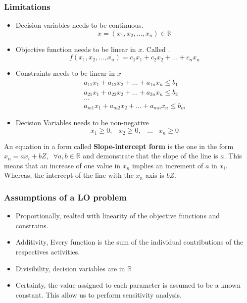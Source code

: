 \subsubsection{Limitations}
\begin{itemize}
    \item Decision variables needs to be continuous. 
        \[x = (x_1, x_2, \dots , x_n) \in \mathbb{R}\]
    \item Objective function needs to be linear in $x$. Called \textit{}.
        \[ f(x_1,x_2, \dots, x_n) = c_1x_1 + c_2x_2 + \dots + c_nx_n \]
    \item Constraints needs to be linear in $x$
        \begin{gather*}
            a_{11}x_1 + a_{12}x_2 + \dots + a_{1n}x_n \leq b_1 \\
            a_{21}x_1 + a_{22}x_2 + \dots + a_{2n}x_n \leq b_2 \\
            \dots\\
            a_{m1}x_1 + a_{m2}x_2 + \dots + a_{mn}x_n \leq b_m
        \end{gather*}
    \item Decision Variables needs to be non-negative
        \[ x_1 \geq 0,\;\;\; x_2 \geq 0,\;\;\; \dots\;\;\; x_n \geq 0 \]
\end{itemize}

An equation in a form called \textbf{Slope-intercept form} is the one in the form $x_n = ax_i + bZ,\;\; \forall a,b \in \mathbb{R}$ and demonstrate that the slope of the line is $a$. This means that an increase
of one value in $x_n$ implies an increment of $a$ in $x_i$. Whereas, the intercept of the line with the $x_n$ axis is $bZ$.\\

\subsubsection{Assumptions of a LO problem}
\begin{itemize}
    \item Proportionally, realted with linearity of the objective functions and constrains.
    \item Additivity, Every function is the sum of the individual contributions of the respectives activities.
    \item Divisibility, decision variables are in $\mathbb{R}$
    \item Certainty, the value assigned to each parameter is assumed to be a known constant. This allow us to perform sensitivity analysis.
\end{itemize}

